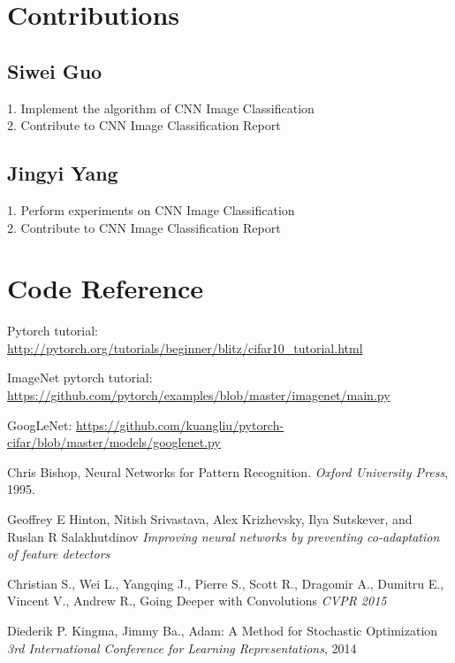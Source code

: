 \documentclass{article} %
\begin{document}
\section{Contributions}
\subsection{Siwei Guo}
1. Implement the algorithm of CNN Image Classification\\
2. Contribute to CNN Image Classification Report

\subsection{Jingyi Yang}
1. Perform experiments on CNN Image Classification\\
2. Contribute to CNN Image Classification Report


\section{Code Reference}
Pytorch tutorial: \url{http://pytorch.org/tutorials/beginner/blitz/cifar10_tutorial.html}\

ImageNet pytorch tutorial: \url{https://github.com/pytorch/examples/blob/master/imagenet/main.py}\

GoogLeNet: \url{https://github.com/kuangliu/pytorch-cifar/blob/master/models/googlenet.py}\

\begin{thebibliography}{9}

 Chris Bishop, Neural Networks for Pattern Recognition.
 \emph{Oxford University Press}, 1995.
 
Geoffrey E Hinton, Nitish Srivastava, Alex Krizhevsky, Ilya Sutskever, and Ruslan R Salakhutdinov
 \emph{Improving neural networks by preventing co-adaptation of feature detectors}

Christian S., Wei L., Yangqing J., Pierre S., Scott R., Dragomir A., Dumitru E.,
Vincent V., Andrew R., Going Deeper with Convolutions
\emph{CVPR 2015}

Diederik P. Kingma, Jimmy Ba., Adam: A Method for Stochastic Optimization
 \emph{3rd International Conference for Learning Representations}, 2014

\end{thebibliography}
\end{document}
